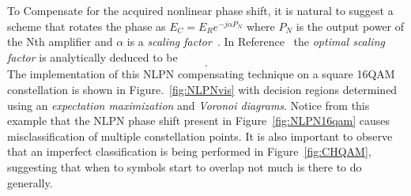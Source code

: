 To Compensate for the acquired nonlinear phase shift, it is natural to suggest a scheme that rotates the phase as $E_{C}=E_{R}e^{-j\alpha P_{N}}$ where  $P_{N}$ is the output power of the Nth amplifier and $\alpha$ is a \textit{scaling factor}~\cite{liu2002improving}. In Reference~\cite{NLPNDSP} the \textit{optimal scaling factor} is analytically deduced to be 
\begin{equation}
 .
\end{equation}
 The implementation of this NLPN compensating technique on a square 16QAM constellation is shown in Figure.~\ref{fig:NLPNvis} with decision regions determined using an \textit{expectation maximization} and \textit{Voronoi diagrams}. Notice from this example that the NLPN phase shift present in Figure~\ref{fig:NLPN16qam} causes misclassification of multiple constellation points. It is also important to observe that an imperfect classification is being performed in Figure~\ref{fig:CHQAM}, suggesting that when to symbols start to overlap not much is there to do generally. ~\\



